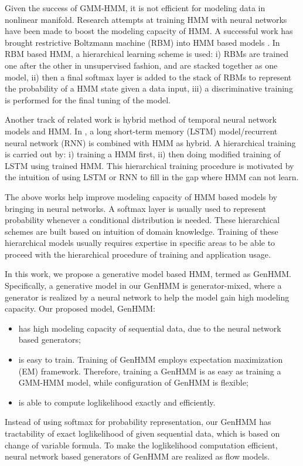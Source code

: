 \documentclass[letterpaper]{article} %
\begin{document}
Given the success of GMM-HMM, it is not efficient for modeling data in nonlinear manifold. Research attempts at training HMM with neural networks have been made to boost the modeling capacity of HMM. A successful work has brought restrictive Boltzmann machine (RBM) \cite{Hinton2012} into HMM based models \cite{hinton2012deepSpeech,li2013hybrid,Miao2013ImprovingLC}. In RBM based HMM, a hierarchical learning scheme is used: i) RBMs are trained one after the other in unsupervised fashion, and are stacked together as one model, ii) then a final softmax layer is added to the stack of RBMs to represent the probability of a HMM state given a data input, iii) a discriminative training is performed for the final tuning of the model.

Another track of related work is hybrid method of temporal neural network models and HMM. In \cite{liu2019lstmHmmHyb,buys2018bridging,vik2016rnnHmm}, a long short-term memory (LSTM) model/recurrent neural network (RNN) is combined with HMM as hybrid. A hierarchical training is carried out by: i) training a HMM first, ii) then doing modified training of LSTM using trained HMM. This hierarchical training procedure is motivated by the intuition of using LSTM or RNN to fill in the gap where HMM can not learn.


The above works help improve modeling capacity of HMM based models by bringing in neural networks. A softmax layer is usually used to represent probability whenever a conditional distribution is needed. These hierarchical schemes are built based on intuition of domain knowledge. Training of these hierarchical models usually requires expertise in specific areas to be able to proceed with the hierarchical procedure of training and application usage. 

In this work, we propose a generative model based HMM, termed as GenHMM. Specifically, a generative model in our GenHMM is generator-mixed, where a generator is realized by a neural network to help the model gain high modeling capacity.
Our proposed model, GenHMM:
\begin{itemize}
  \item has high modeling capacity of sequential data, due to the neural network based generators;
\item is easy to train. Training of GenHMM employs expectation maximization (EM) framework. Therefore, training a GenHMM is as easy as training a GMM-HMM model, while configuration of GenHMM is flexible;
\item is able to compute loglikelihood exactly and efficiently.
\end{itemize}
Instead of using softmax for probability representation, our GenHMM has tractability of exact loglikelihood of given sequential data, which is based on change of variable formula. To make the loglikelihood computation efficient, neural network based generators of GenHMM are realized as flow models. 
\end{document}
